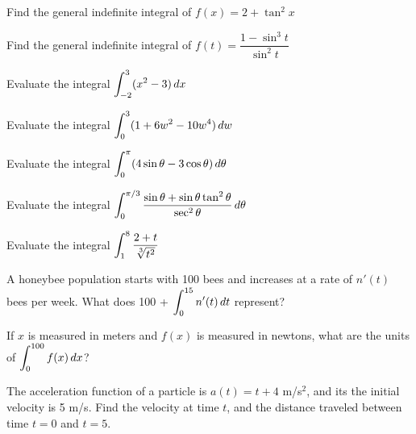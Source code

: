 \documentclass[notes]{subfiles}
\begin{document}
		\begin{ex}
			Find the general indefinite integral of $f(x) = 2+\tan^2x$
		\end{ex}
			\newpage
			
		\begin{ex}
			Find the general indefinite integral of $f(t) = \dfrac{1-\sin^3t}{\sin^2t}$
		\end{ex}
			
		\begin{ex}
			Evaluate the integral $\displaystyle \int_{-2}^3 (x^2-3)\, dx$
		\end{ex}
			
		\begin{ex}
			Evaluate the integral $\displaystyle \int_0^3 (1 + 6w^2-10w^4)\,dw$
		\end{ex}
			
		\begin{ex}
			Evaluate the integral $\displaystyle \int_0^\pi (4\sin \theta -3\cos\theta)\, d\theta$
		\end{ex}
			
		\begin{ex}
			Evaluate the integral $\displaystyle \int_0^{\pi/3} \dfrac{\sin\theta + \sin\theta\tan^2\theta}{\sec^2\theta}\,d\theta$
		\end{ex}
			\newpage
			
		\begin{ex}
			Evaluate the integral $\displaystyle \int_1^8 \dfrac{2+t}{\sqrt[3]{t^2}}$
		\end{ex}
			
		\begin{ex}
			A honeybee population starts with 100 bees and increases at a rate of $n'(t)$ bees per week.  What does 100 + $\displaystyle \int_0^{15}n'(t)\,dt$ represent?
		\end{ex}
			
		\begin{ex}
			If $x$ is measured in meters and $f(x)$ is measured in newtons, what are the units of $\displaystyle \int_0^{100}f(x)\,dx$?
		\end{ex}
			
		\begin{ex}
			The acceleration function of a particle is $a(t) = t+4$ m/s$^2$, and its the initial velocity is 5 m/s.  Find the velocity at time $t$, and the distance traveled between time $t = 0$ and $t = 5$.
		\end{ex}
			\newpage
			
\end{document}
